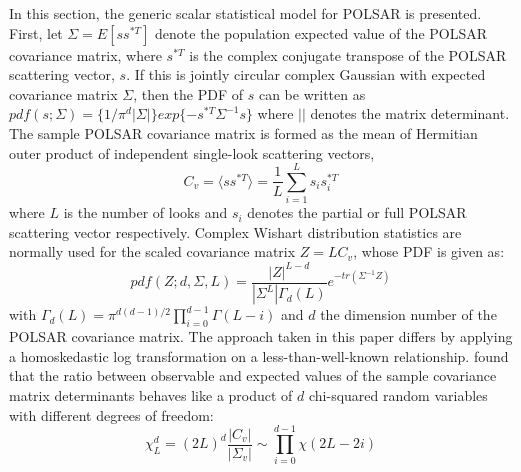 \documentclass[]{tRSL2e}
\begin{document}
In this section, the generic scalar statistical model for POLSAR is presented.
%
%
First, let $\Sigma=E [ss^{*T}]$ denote the population expected value of the POLSAR covariance matrix,
  where $s^{*T}$ is the complex conjugate transpose of the POLSAR scattering vector, $s$. 
If this is jointly circular complex Gaussian with expected covariance matrix $\Sigma$,
  then the PDF of $s$ can be written as
$pdf(s;\Sigma)=\{1/{\pi^d|\Sigma|}\} exp\{-s^{*T}\Sigma^{-1}s\}$
where $||$ denotes the matrix determinant.
%
The sample POLSAR covariance matrix is formed as the mean of Hermitian outer product of independent single-look scattering vectors,
     \vspace{-4mm}
\begin{equation}
  C_v = \langle ss^{*T} \rangle = \frac{1}{L} \sum^L_{i=1}s_is_i^{*T}
\end{equation}
where $L$ is the number of looks
 and $s_i$ denotes the partial or full POLSAR scattering vector respectively.
%
Complex Wishart distribution statistics are normally used for the scaled covariance matrix
$Z=LC_v$, whose PDF is given as:
\begin{equation}
  pdf(Z;d,\Sigma,L)=\frac{|Z|^{L-d}}{|\Sigma^L|\Gamma_d(L)}e^{-tr(\Sigma^{-1}Z)}
\end{equation}
with $\Gamma_d(L) = \pi^{d(d-1)/2} \prod^{d-1}_{i=0}\Gamma(L-i)$
and $d$ the dimension number of the POLSAR covariance matrix.
%
The approach taken in this paper differs by applying a homoskedastic log transformation  on a less-than-well-known relationship.
\citet{Goodman_1963_AMS_178} found
that the ratio between observable and expected values of the sample covariance matrix determinants
  behaves like a product of $d$ chi-squared random variables with different degrees of freedom: 
\vspace{-2mm}
\begin{equation}
\chi^d_L = (2L)^d \frac{|C_v|}{|\Sigma_v|} \sim \prod_{i=0}^{d-1} \chi (2L-2i)
\label{eqn:prod_chi_squared_rv}  
\end{equation}
\end{document}
